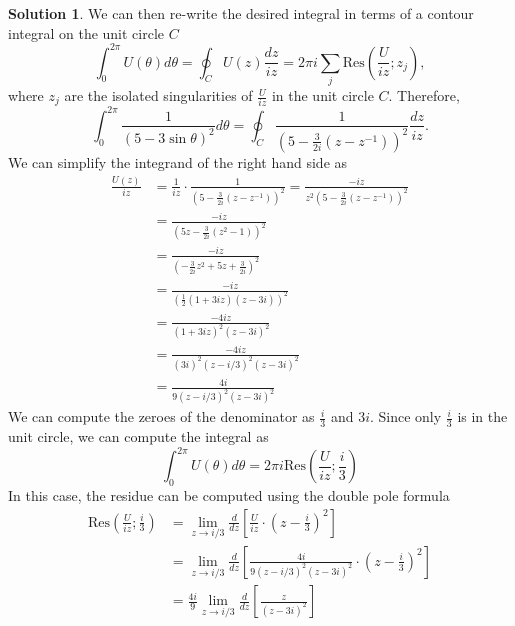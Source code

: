 \documentclass[12pt]{article}
\newcommand{\Res}{\text{Res}}
\theoremstyle{definition}
\newtheorem{sol}{Solution}
\theoremstyle{remark}
\begin{document}
\begin{sol}
We can then re-write the desired integral in terms of a contour integral on the unit circle $C$
\begin{equation}
    \int_0^{2\pi} U(\theta)d\theta = \oint_C U(z) \frac{dz}{iz} = 2\pi i \sum_j \Res\left( \frac{U}{iz}; z_j  \right),
\end{equation}
where $z_j$ are the isolated singularities of $\frac{U}{iz}$  in the unit circle $C$. Therefore,
\begin{equation}
      \int_0^{2\pi} \frac{1}{(5-3\sin\theta)^2} d\theta = \oint_C \frac{1}{(5- \frac{3}{2i}  (z-z^{-1}))^2} \frac{dz}{iz}. 
\end{equation}
We can simplify the integrand of the right hand side as 
\begin{align}
    \frac{U(z)}{iz} &= \frac{1}{iz}\cdot \frac{1}{(5- \frac{3}{2i}  (z-z^{-1}))^2} =   \frac{-iz}{z^2(5-\frac{3}{2i}(z-z^{-1}))^2}\\
                    &= \frac{-iz}{(5z - \frac{3}{2i}(z^2-1))^2} \\ 
                    &= \frac{-iz}{(-\frac{3}{2i}z^2 + 5z + \frac{3}{2i} )^2}\\
                    &= \frac{-iz}{(\frac{1}{2}( 1 + 3iz )(z-3i))^2} \\
                    &= \frac{-4iz}{(1+3iz)^2(z-3i)^2} \\
                    &= \frac{-4iz}{(3i)^2(z-i/3)^2(z-3i)^2}\\ 
                    &= \frac{4i}{9(z-i/3)^2(z-3i)^2} 
\end{align}
We can compute the zeroes of the denominator as $\frac{i}{3}$ and $3i$. Since only $\frac{i}{3}$ is in the unit circle, we can compute the integral as
\begin{equation}
\int_0^{2\pi} U(\theta)d\theta = 2\pi i \Res\left( \frac{U}{iz}; \frac{i}{3}  \right )
\end{equation}
In this case, the residue can be computed using the double pole formula
\begin{align}
    \Res\left( \frac{U}{iz}; \frac{i}{3}  \right ) &= \lim\limits_{z\to i/3} \frac{d}{dz} \left[  \frac{U}{iz} \cdot \left(z-\frac{i}{3} \right)^2 \right]\\
                                                   &= \lim\limits_{z\to i/3} \frac{d}{dz} \left[ \frac{4i}{9(z-i/3)^2(z-3i)^2}  \cdot  \left(z-\frac{i}{3} \right)^2  \right] \\
                                                   &=  \frac{4i}{9} \lim\limits_{z\to i/3}\frac{d}{dz} \left[ \frac{z}{(z-3i)^2} \right]\\

\end{align}
\end{sol}
\end{document}
